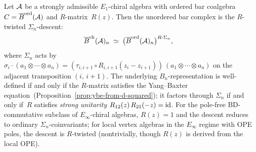 \begin{proposition}
\label{prop:r-matrix-descent}
Let $\mathcal{A}$ be a strongly admissible $E_1$-chiral algebra with
ordered bar coalgebra $C=\overline{B}^{\mathrm{ord}}(\mathcal{A})$ and
$R$-matrix~$R(z)$. Then the unordered bar complex is the
$R$-twisted $\Sigma_n$-descent:
\begin{equation}\label{eq:descent-identification}
\overline{B}^{\mathrm{ch}}(\mathcal{A})_n
\;\simeq\;
\bigl(\overline{B}^{\mathrm{ord}}(\mathcal{A})_n\bigr)^{R\text{-}\Sigma_n},
\end{equation}
where $\Sigma_n$ acts by $\sigma_i\cdot(a_1\otimes\cdots\otimes a_n)
=(\tau_{i,i+1}\circ R_{i,i+1}(z_i{-}z_{i+1}))\,
(a_1\otimes\cdots\otimes a_n)$
on the adjacent transposition $(i,\,i{+}1)$. The
underlying $B_n$-representation is well-defined if and only
if the $R$-matrix satisfies the Yang--Baxter
equation~\textup{(Proposition~\ref{prop:ybe-from-d-squared})};
it factors through $\Sigma_n$ if and only if~$R$
satisfies \emph{strong unitarity}
$R_{12}(z)\,R_{21}(-z)=\mathrm{id}$.
For the pole-free BD-commutative subclass of
$E_\infty$-chiral algebras, $R(z)=1$ and the descent
reduces to ordinary $\Sigma_n$-coinvariants; for local
vertex algebras in the $E_\infty$ regime with OPE poles, the descent is
$R$-twisted (nontrivially, though $R(z)$ is derived from
the local OPE).
\end{proposition}


